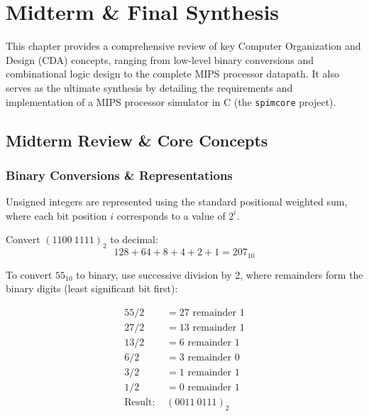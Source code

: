 \chapter{Midterm \& Final Synthesis}

This chapter provides a comprehensive review of key Computer Organization and Design (CDA) concepts, ranging from low-level binary conversions and combinational logic design to the complete MIPS processor datapath. It also serves as the ultimate synthesis by detailing the requirements and implementation of a MIPS processor simulator in C (the \texttt{spimcore} project).

\section{Midterm Review \& Core Concepts}

\subsection{Binary Conversions \& Representations}

\begin{remark}
Unsigned integers are represented using the standard positional weighted sum, where each bit position $i$ corresponds to a value of $2^i$.
\end{remark}

\begin{example}
Convert $(1100\ 1111)_2$ to decimal:
\begin{equation}
128 + 64 + 8 + 4 + 2 + 1 = 207_{10}
\end{equation}
\end{example}

\begin{example}
To convert $55_{10}$ to binary, use successive division by 2, where remainders form the binary digits (least significant bit first):
\begin{center}
\begin{align*}
55 / 2 &= 27 \text{ remainder } 1 \\
27 / 2 &= 13 \text{ remainder } 1 \\
13 / 2 &= 6 \text{ remainder } 1 \\
6 / 2 &= 3 \text{ remainder } 0 \\
3 / 2 &= 1 \text{ remainder } 1 \\
1 / 2 &= 0 \text{ remainder } 1 \\
\text{Result: } &(0011\ 0111)_2
\end{align*}
\end{center}
\end{example}

